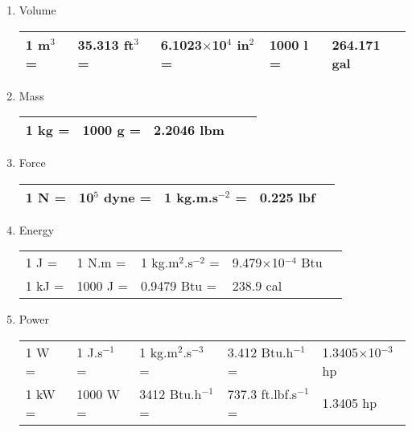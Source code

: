 \documentclass[12pts,a4paper,amsmath,amssymb,floatfix]{article}%
\begin{document}
\begin{enumerate}[1)]
\item Volume %
     \begin{center}
     \begin{tabular}{|l l l l l|}
       \hline    
       1 m$^{3}$ =& 35.313 ft$^{3}$ =& 6.1023$\times$10$^{4}$ in$^{2}$ =& 1000 l =& 264.171 gal \\
       \hline            
     \end{tabular}
     \end{center}
          
\item Mass %
     \begin{center}
     \begin{tabular}{|l l l l l|}
       \hline    
        1 kg =& 1000 g =& 2.2046 lbm & & \\
       \hline            
     \end{tabular}
     \end{center}


          
\item Force %
     \begin{center}
     \begin{tabular}{|l l l l l|}
       \hline    
         1 N =& 10$^{5}$ dyne =& 1 kg.m.s$^{-2}$ =& 0.225 lbf & \\
       \hline            
     \end{tabular}
     \end{center}

     
\item Energy %
     \begin{center}
     \begin{tabular}{|l l l l l|}
       \hline
       1 J =& 1 N.m  =& 1 kg.m$^{2}$.s$^{-2}$ =& 9.479$\times$10$^{-4}$ Btu &  \\
       1 kJ =&  1000 J  =&  0.9479 Btu  =& 238.9 cal &                      \\
       \hline           
     \end{tabular}
     \end{center}
     
\item Power %
     \begin{center}
     \begin{tabular}{|l l l l l|}
       \hline
       1 W =& 1 J.s$^{-1}$  =& 1 kg.m$^{2}$.s$^{-3}$ =& 3.412 Btu.h$^{-1}$ =& 1.3405$\times$10$^{-3}$ hp   \\
       1 kW =&  1000 W  =& 3412 Btu.h$^{-1}$  =& 737.3 ft.lbf.s$^{-1}$ =& 1.3405 hp  \\
       \hline           
     \end{tabular}
     \end{center}
     

\end{enumerate}
\end{document}
